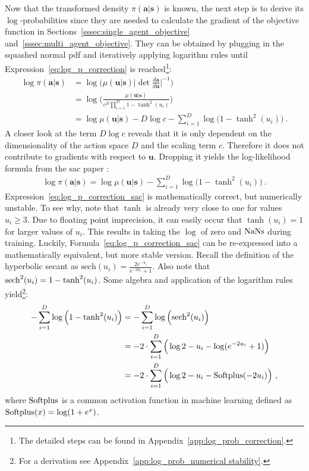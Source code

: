 Now that the transformed density $\pi (\mathbf a | \mathbf s)$ is known, the next step is to derive its $\log$-probabilities since they are needed to calculate the gradient of the objective function in Sections~\ref{sssec:single_agent_objective} and~\ref{sssec:multi_agent_objective}. They can be obtained by plugging in the squashed normal \gls{pdf} and iteratively applying logarithm rules until Expression~\ref{eq:log_p_correction} is reached\footnote{The detailed steps can be found in Appendix~\ref{app:log_prob_correction}.}:
\begin{align}
    \log \pi (\mathbf a | \mathbf s)  & = \log \bigg( \mu ( \mathbf u | \mathbf s) \bigg| \det \frac{d \mathbf a}{d \mathbf u} \bigg|^{-1} \bigg) \nonumber\\
    & = \log \Big( \frac{\mu (\mathbf u | \mathbf s)}{ c^D \prod_{i=1}^D 1- \tanh^2 (u_i)} \Big) \nonumber\\
    & = \log \mu (\mathbf u | \mathbf s) - D \log c - \sum_{i=1}^D \log \Big( 1- \tanh^2 (u_i) \Big)~. \label{eq:log_p_correction}
\end{align}
A closer look at the term $D \log c$ reveals that it is only dependent on the dimensionality of the action space $D$ and the scaling term $c$. Therefore it does not contribute to gradients with respect to $\mathbf u$. Dropping it yields the log-likelihood formula from the \gls{sac} paper \cite{haarnojaSoftActorCriticOffPolicy2018}:
\begin{gather}\label{eq:log_p_correction_sac}
     \log \pi (\mathbf a | \mathbf s) = \log \mu (\mathbf u | \mathbf s) - \sum_{i=1}^D \log \Big( 1- \tanh^2 (u_i) \Big)~.
\end{gather}
Expression~\ref{eq:log_p_correction_sac} is mathematically correct, but numerically unstable. To see why, note that $\tanh$ is already very close to one for values $u_i \geq 3$. Due to floating point imprecision, it can easily occur that $\tanh (u_i) = 1$ for larger values of $u_i$. This results in taking the $\log$ of zero and $\operatorname{NaNs}$ during training. Luckily, Formula~\ref{eq:log_p_correction_sac} can be re-expressed into a mathematically equivalent, but more stable version. Recall the definition of the hyperbolic secant as $\text{sech}(u_i) = \frac{2e^{-u_i}}{e^{-2u_i} + 1}$. Also note that $\operatorname{sech}^2(u_i) = 1 - \tanh^2 (u_i)$. Some algebra and application of the logarithm rules yield\footnote{For a derivation see Appendix~\ref{app:log_prob_numerical stability}.}:
\begin{align}
    - \sum_{i=1}^D \log \Big( 1- \tanh^2 (u_i) \Big) & = - \sum_{i=1}^D \log \Big( \text{sech}^2 (u_i) \Big) \nonumber \\
    & = - 2 \cdot \sum_{i=1}^D \Big( \log 2 -u_i - \log (e^{-2u_i} + 1) \Big) \nonumber \\
    & = - 2 \cdot \sum_{i=1}^D \Big( \log 2 -u_i - \operatorname{Softplus}(-2u_i) \Big) \label{eq:numerically_stable_log_p}~,
\end{align}
where $\operatorname{Softplus}$ is a common activation function in machine learning defined as $\operatorname{Softplus}(x) = \log (1 + e^x)$.


